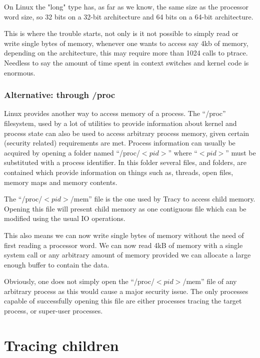 \documentclass[a4paper, twoside, 10pt]{report}
\begin{document}
On Linux the "long" type has, as far as we know, the same size as the
processor word size, so 32 bits on a 32-bit architecture and
64 bits on a 64-bit architecture.

This is where the trouble starts, not only is it not possible to simply read
or write single bytes of memory, whenever one wants to access say 4kb of
memory, depending on the architecture, this may require more than 1024
calls to ptrace. Needless to say the amount of time spent in context switches
and kernel code is enormous.

\subsubsection{Alternative: through /proc}
Linux provides another way to access memory of a process. The ``/proc''
filesystem, used by a lot of utilities to provide information about kernel
and process state can also be used to access arbitrary process memory,
given certain (security related) requirements are met.
Process information can usually be acquired by opening a folder
named ``/proc/$<pid>$'' where ``$<pid>$'' must be substituted with a process
identifier. In this folder several files, and folders, are contained which
provide information on things such as, threads, open files, memory maps and
memory contents.

The ``/proc/$<pid>$/mem'' file is the one used by Tracy to access child memory.
Opening this file will present child memory as one contiguous file which
can be modified using the usual IO operations.

This also means we can now write single bytes of memory without the need
of first reading a processor word. We can now read 4kB of memory with a
single system call or any arbitrary amount of memory provided we can allocate
a large enough buffer to contain the data.

Obviously, one does not simply open the ``/proc/$<pid>$/mem'' file of any
arbitrary process as this would cause a major security issue. The only
processes capable of successfully opening this file are either processes
tracing the target process, or super-user processes.


\section{Tracing children}
\end{document}
